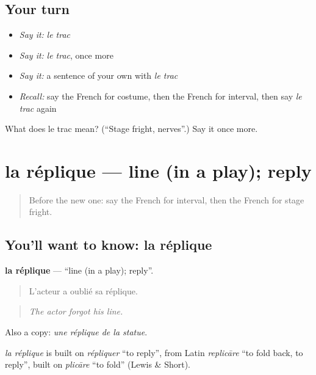 \subsection*{Your turn}
\begin{itemize}
\raggedright
  \item \emph{Say it:} \emph{le trac}
  \item \emph{Say it:} \emph{le trac}, once more
  \item \emph{Say it:} a sentence of your own with \emph{le trac}
  \item \emph{Recall:} say the French for costume, then the French for interval, then say \emph{le trac} again
\end{itemize}

\begin{tcolorbox}[breakable,colback=teal!4,colframe=teal!35!black,title={Before you move on}]
What does le trac mean? (\textquotedblleft{}Stage fright, nerves\textquotedblright{}.) Say it once more.
\end{tcolorbox}
\section[la réplique]{la réplique — line (in a play); reply}

\label{lesson:FR-C515-replique}



\begin{quote}
Before the new one: say the French for interval, then the French for stage fright.
\end{quote}

\subsection*{You'll want to know: la réplique}
\textbf{la réplique} — \textquotedblleft{}line (in a play); reply\textquotedblright{}.

\begin{quote}
L'acteur a oublié sa réplique.
\end{quote}

\begin{quote}
\emph{The actor forgot his line.}
\end{quote}

Also a copy: \emph{une réplique de la statue}.

\begin{cousinweb}
\emph{la réplique} is built on \emph{répliquer} \textquotedblleft{}to reply\textquotedblright{}, from Latin \emph{replicāre} \textquotedblleft{}to fold back, to reply\textquotedblright{}, built on \emph{plicāre} \textquotedblleft{}to fold\textquotedblright{} (Lewis \& Short).
\end{cousinweb}

